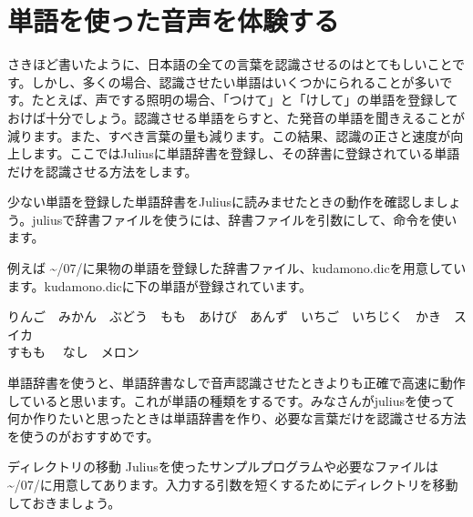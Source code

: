 \newpage
\section{単語を使った音声を体験する}
さきほど書いたように、日本語の全ての言葉を認識させるのはとてもしいことです。しかし、多くの場合、認識させたい単語はいくつかにられることが多いです。たとえば、声でする照明の場合、「つけて」と「けして」の単語を登録しておけば十分でしょう。認識させる単語をらすと、た発音の単語を聞きえることが減ります。また、すべき言葉の量も減ります。この結果、認識の正さと速度が向上します。ここではJuliusに単語辞書を登録し、その辞書に登録されている単語だけを認識させる方法をします。

少ない単語を登録した単語辞書をJuliusに読みませたときの動作を確認しましょう。juliusで辞書ファイルを使うには、辞書ファイルを引数にして、命令を使います。\\

例えば \textasciitilde /07/に果物の単語を登録した辞書ファイル、kudamono.dicを用意しています。kudamono.dicに下の単語が登録されています。
\begin{center}
	りんご　みかん　ぶどう　もも　あけび　あんず　いちご　いちじく　かき　スイカ\\すもも　	なし　メロン
\end{center}

単語辞書を使うと、単語辞書なしで音声認識させたときよりも正確で高速に動作していると思います。これが単語の種類をするです。みなさんがjuliusを使って何か作りたいと思ったときは単語辞書を作り、必要な言葉だけを認識させる方法を使うのがおすすめです。\\

\begin{itembox}[c]{ディレクトリの移動}
        Juliusを使ったサンプルプログラムや必要なファイルは \textasciitilde /07/に用意してあります。入力する引数を短くするためにディレクトリを移動しておきましょう。\\
\end{itembox}

\begin{tcolorbox}[title=\useOmetoi]
\begin{enumerate}
\end{enumerate}
\end{tcolorbox}


